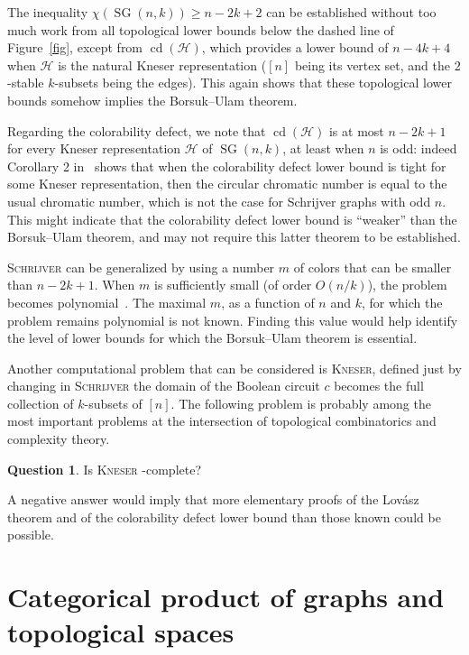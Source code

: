 \documentclass[12pt]{amsart}
\theoremstyle{definition}
\newtheorem{question}{Question}
\def\HH{\mathcal{H}}
\renewcommand{\geq}{\geqslant}
\def\SG{\operatorname{SG}}
\def\cd{\operatorname{cd}}
\begin{document}
The inequality $\chi(\SG(n,k))\geq n-2k+2$ can be established without too much work from all topological lower bounds below the dashed line of Figure~\ref{fig}, except from $\cd(\HH)$, which provides a lower bound of $n-4k+4$ when $\HH$ is the natural Kneser representation ($[n]$ being its vertex set, and the $2$-stable $k$-subsets being the edges). This again shows that these topological lower bounds somehow implies the Borsuk--Ulam theorem.

Regarding the colorability defect, we note that $\cd(\HH)$ is at most $n-2k+1$ for every Kneser representation $\HH$ of $\SG(n,k)$, at least when $n$ is odd: indeed Corollary 2 in~\cite{alishahi2017strengthening} shows that when the colorability defect lower bound is tight for some Kneser representation, then the circular chromatic number is equal to the usual chromatic number, which is not the case for Schrijver graphs with odd $n$. This might indicate that the colorability defect lower bound is ``weaker'' than the Borsuk--Ulam theorem, and may not require this latter theorem to be established.

\textsc{Schrijver} can be generalized by using a number $m$ of colors that can be smaller than $n-2k+1$. When $m$ is sufficiently small (of order $O(n/k)$), the problem becomes polynomial~\cite{haviv2023finding}. The maximal $m$, as a function of $n$ and $k$, for which the problem remains polynomial is not known. Finding this value would help identify the level of lower bounds for which the Borsuk--Ulam theorem is essential.

Another computational problem that can be considered is \textsc{Kneser}, defined just by changing in \textsc{Schrijver} the domain of the Boolean circuit $c$ becomes the full collection of $k$-subsets of $[n]$. The following problem is probably among the most important problems at the intersection of topological combinatorics and complexity theory.

\begin{question}\label{q:kneser}
    Is \textsc{Kneser} \PPA-complete?
\end{question}

 A negative answer would imply that more elementary proofs of the Lov\'asz theorem and of the colorability defect lower bound than those known could be possible.


\section{Categorical product of graphs and topological spaces}\label{sec:product}
\end{document}
